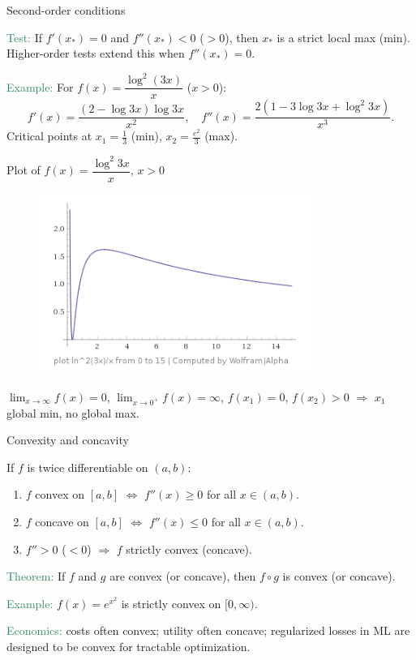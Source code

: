 \documentclass[11pt,aspectratio=169]{beamer}
\begin{document}
\begin{frame}{Second-order conditions}

\textcolor{SeaGreen}{Test:} If $f'(x_*)=0$ and $f''(x_*)<0$ ($>0$), then $x_*$ is a strict local max (min). Higher-order tests extend this when $f''(x_*)=0$.
\smallskip

\textcolor{SeaGreen}{Example:} For $f(x)=\dfrac{\log^2(3x)}{x}$ ($x>0$): 
\[
f'(x)=\frac{(2-\log 3x)\log 3x}{x^2},\quad
f''(x)=\frac{2(1-3\log 3x + \log^2 3x)}{x^3}.
\]
Critical points at $x_1=\frac{1}{3}$ (min), $x_2=\frac{e^2}{3}$ (max).
\end{frame}


\begin{frame}{Plot of $f(x)=\dfrac{\log^2 3x}{x}$, $x>0$}

\begin{figure}
\includegraphics[width=3.5in]{img/ima} 
\end{figure}
$\lim_{x \rightarrow \infty} f(x)=0$, $\lim_{x \rightarrow 0^+} f(x)=\infty$,
$f(x_1)=0$, $f(x_2)>0$ $\Rightarrow$ $x_1$ global min, no global max.
\end{frame}



\begin{frame}{Convexity and concavity}

If $f$ is twice differentiable on $(a,b)$:
\begin{enumerate}
\item $f$ convex on $[a,b]$ $\Leftrightarrow$ $f''(x)\ge 0$ for all $x\in(a,b)$.
\item $f$ concave on $[a,b]$ $\Leftrightarrow$ $f''(x)\le 0$ for all $x\in(a,b)$.
\item $f''>0$ ($<0$) $\Rightarrow$ $f$ strictly convex (concave).
\end{enumerate}
\bigskip

 \textcolor{SeaGreen}{Theorem:} If $f$ and $g$ are convex (or concave), then $f \circ g$ is convex (or concave).
 
\textcolor{SeaGreen}{Example:} $f(x)=e^{x^2}$ is strictly convex on $[0, \infty)$.

\bigskip

\textcolor{SeaGreen}{Economics:} costs often convex; utility often concave; regularized losses in ML are designed to be convex for tractable optimization.
\end{frame}
\end{document}
